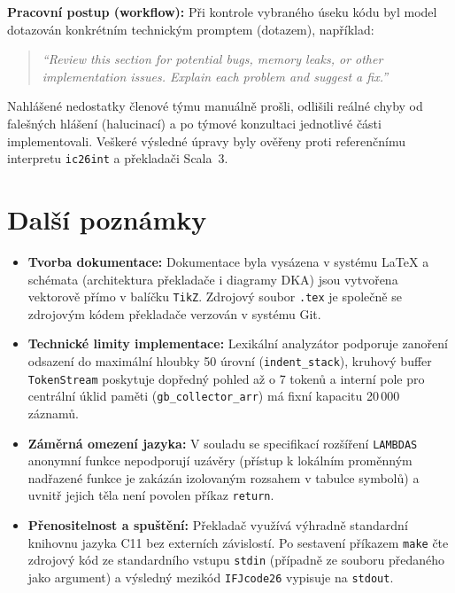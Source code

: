 \documentclass[11pt, a4paper]{article}
\begin{document}
\textbf{Pracovní postup (workflow):} Při kontrole vybraného úseku kódu byl model dotazován konkrétním technickým promptem (dotazem), například:
\begin{quote}
  \small\itshape
  ``Review this section for potential bugs, memory leaks, or other implementation issues. Explain each problem and suggest a fix.''
\end{quote}
Nahlášené nedostatky členové týmu manuálně prošli, odlišili reálné chyby od falešných hlášení (halucinací) a po týmové konzultaci jednotlivé části implementovali. Veškeré výsledné úpravy byly ověřeny proti referenčnímu interpretu \texttt{ic26int} a překladači Scala~3.


\section{Další poznámky}
\begin{itemize}
  \item \textbf{Tvorba dokumentace:} Dokumentace byla vysázena v systému \LaTeX{} a schémata (architektura překladače i diagramy DKA) jsou vytvořena vektorově přímo v balíčku \texttt{TikZ}. Zdrojový soubor \texttt{.tex} je společně se zdrojovým kódem překladače verzován v systému Git.
  \item \textbf{Technické limity implementace:} Lexikální analyzátor podporuje zanoření odsazení do maximální hloubky 50 úrovní (\texttt{indent\_stack}), kruhový buffer \texttt{TokenStream} poskytuje dopředný pohled až o 7 tokenů a interní pole pro centrální úklid paměti (\texttt{gb\_collector\_arr}) má fixní kapacitu 20\,000 záznamů.
  \item \textbf{Záměrná omezení jazyka:} V souladu se specifikací rozšíření \texttt{LAMBDAS} anonymní funkce nepodporují uzávěry (přístup k lokálním proměnným nadřazené funkce je zakázán izolovaným rozsahem v tabulce symbolů) a uvnitř jejich těla není povolen příkaz \texttt{return}.
  \item \textbf{Přenositelnost a spuštění:} Překladač využívá výhradně standardní knihovnu jazyka C11 bez externích závislostí. Po sestavení příkazem \texttt{make} čte zdrojový kód ze standardního vstupu \texttt{stdin} (případně ze souboru předaného jako argument) a výsledný mezikód \texttt{IFJcode26} vypisuje na \texttt{stdout}.
\end{itemize}
\end{document}
